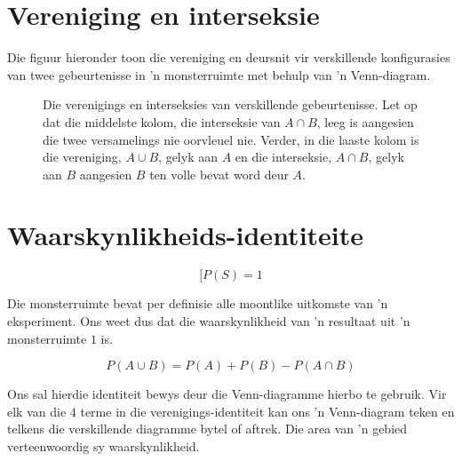 \section{Vereniging en interseksie}




Die figuur hieronder toon die vereniging en deursnit vir verskillende konfigurasies van twee gebeurtenisse in 'n monsterruimte met behulp van 'n Venn-diagram.

\begin{figure}[H]
  
  \begin{caption*}{Die verenigings en interseksies van verskillende gebeurtenisse. Let op dat die middelste kolom, die interseksie van $A \cap B$, leeg is aangesien die twee versamelings nie oorvleuel nie. Verder, in die laaste kolom is die vereniging, $A \cup B$, gelyk aan $A$ en die interseksie, $A \cap B$, gelyk aan $B$ aangesien $B$ ten volle bevat word deur $A$.}\end{caption*}
  \label{fig:venn_union_intersection}
\end{figure}
\par



\section{Waarskynlikheids-identiteite}

  \[[P(S)=1\]


Die monsterruimte bevat per definisie alle moontlike uitkomste van 'n eksperiment. Ons weet dus dat die waarskynlikheid van 'n resultaat uit 'n monsterruimte $1$ is.


  \[P(A \cup B) = P(A) + P(B) - P(A \cap B)\]


Ons sal hierdie identiteit bewys deur die Venn-diagramme hierbo te gebruik. Vir elk van die $4$ terme in die verenigings-identiteit kan ons 'n Venn-diagram teken en telkens die verskillende diagramme bytel of aftrek. Die area van 'n gebied verteenwoordig sy waarskynlikheid.\par


